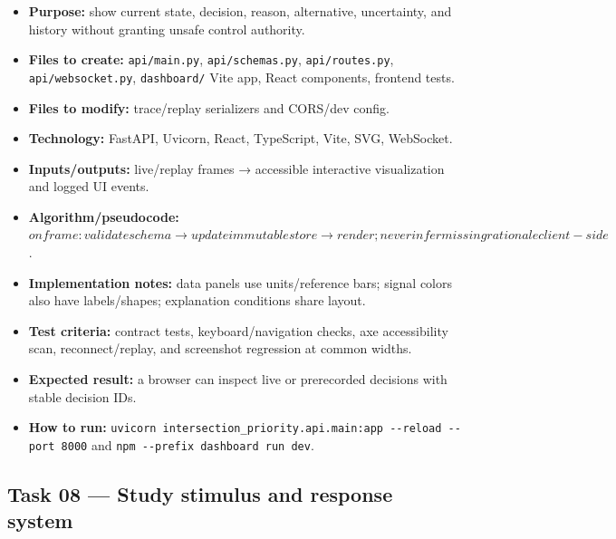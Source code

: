 \documentclass[
  english,
  11pt,
  a4paper,
]{article}
\providecommand{\tightlist}{%
  \setlength{\itemsep}{0pt}\setlength{\parskip}{0pt}}
\begin{document}
\begin{itemize}
\tightlist
\item
  \textbf{Purpose:} show current state, decision, reason, alternative,
  uncertainty, and history without granting unsafe control authority.
\item
  \textbf{Files to create:} \texttt{api/main.py},
  \texttt{api/schemas.py}, \texttt{api/routes.py},
  \texttt{api/websocket.py}, \texttt{dashboard/} Vite app, React
  components, frontend tests.
\item
  \textbf{Files to modify:} trace/replay serializers and CORS/dev
  config.
\item
  \textbf{Technology:} FastAPI, Uvicorn, React, TypeScript, Vite, SVG,
  WebSocket.
\item
  \textbf{Inputs/outputs:} live/replay frames → accessible interactive
  visualization and logged UI events.
\item
  \textbf{Algorithm/pseudocode:}
  \(on frame: validate schema \rightarrow{} update immutable store \rightarrow{} render; never infer missing rationale client-side\).
\item
  \textbf{Implementation notes:} data panels use units/reference bars;
  signal colors also have labels/shapes; explanation conditions share
  layout.
\item
  \textbf{Test criteria:} contract tests, keyboard/navigation checks,
  axe accessibility scan, reconnect/replay, and screenshot regression at
  common widths.
\item
  \textbf{Expected result:} a browser can inspect live or prerecorded
  decisions with stable decision IDs.
\item
  \textbf{How to run:}
  \texttt{uvicorn\ intersection\_priority.api.main:app\ -\/-reload\ -\/-port\ 8000}
  and \texttt{npm\ -\/-prefix\ dashboard\ run\ dev}.
\end{itemize}

\subsection{Task 08 --- Study stimulus and response
system}\label{task-08-study-stimulus-and-response-system}
\end{document}
